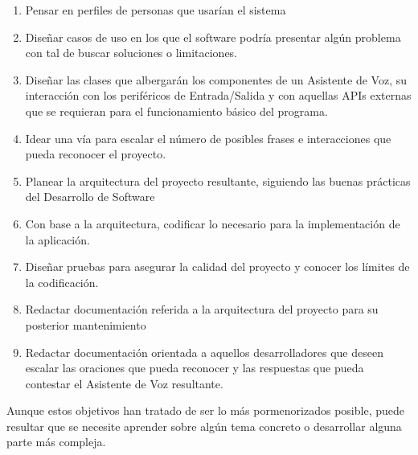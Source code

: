 \begin{enumerate}[O-DD.1 -]
	\item Pensar en perfiles de personas que usarían el sistema
	\item Diseñar casos de uso en los que el software podría presentar algún problema con tal de buscar soluciones o limitaciones.
	\item Diseñar las clases que albergarán los componentes de un Asistente de Voz, su interacción con los periféricos de Entrada/Salida y con aquellas APIs externas que se requieran para el funcionamiento básico del programa.
	\item Idear una vía para escalar el número de posibles frases e interacciones que pueda reconocer el proyecto.
	\item Planear la arquitectura del proyecto resultante, siguiendo las buenas prácticas del Desarrollo de Software
	\item Con base a la arquitectura, codificar lo necesario para la implementación de la aplicación.
	\item Diseñar pruebas para asegurar la calidad del proyecto y conocer los límites de la codificación.
	\item Redactar documentación referida a la arquitectura del proyecto para su posterior mantenimiento
	\item Redactar documentación orientada a aquellos desarrolladores que deseen escalar las oraciones que pueda reconocer y las respuestas que pueda contestar el Asistente de Voz resultante.
	
\end{enumerate}

Aunque estos objetivos han tratado de ser lo más pormenorizados posible, puede resultar que se necesite aprender sobre algún tema concreto o desarrollar alguna parte más compleja.

